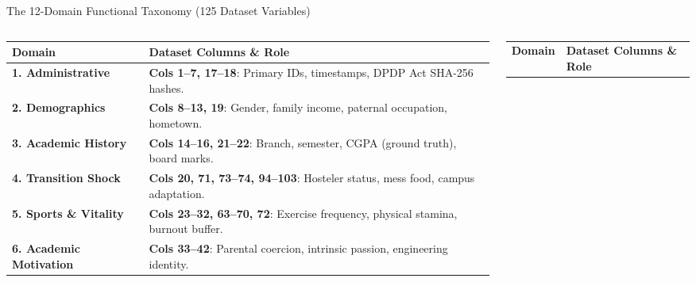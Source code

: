 \documentclass{beamer}
\begin{document}
\begin{frame}[t]{The 12-Domain Functional Taxonomy (125 Dataset Variables)}
  \begin{columns}[T]
    \begin{column}{0.49\textwidth}
      \begin{tcolorbox}[colback=white, colframe=BlueDeep, arc=1.2mm, boxrule=0.8pt, top=0.5mm, bottom=0.5mm, left=1mm, right=1mm, title={\scriptsize\bfseries\color{white}Contextual \& Somatic Domains (1--6)}, colbacktitle=BlueDeep]
        \fontsize{4.8pt}{5.8pt}\selectfont
        \renewcommand{\arraystretch}{0.85}
        \begin{tabularx}{\linewidth}{@{}l X@{}}
          \toprule
          \textbf{Domain} & \textbf{Dataset Columns \& Role} \\
          \midrule
          \rowcolor{BlueLight} \textbf{1. Administrative} & \textbf{Cols 1--7, 17--18}: Primary IDs, timestamps, DPDP Act SHA-256 hashes. \\
          \rowcolor{CanvasBG} \textbf{2. Demographics} & \textbf{Cols 8--13, 19}: Gender, family income, paternal occupation, hometown. \\
          \rowcolor{BlueLight} \textbf{3. Academic History} & \textbf{Cols 14--16, 21--22}: Branch, semester, CGPA (ground truth), board marks. \\
          \rowcolor{CanvasBG} \textbf{4. Transition Shock} & \textbf{Cols 20, 71, 73--74, 94--103}: Hosteler status, mess food, campus adaptation. \\
          \rowcolor{BlueLight} \textbf{5. Sports \& Vitality} & \textbf{Cols 23--32, 63--70, 72}: Exercise frequency, physical stamina, burnout buffer. \\
          \rowcolor{CanvasBG} \textbf{6. Academic Motivation} & \textbf{Cols 33--42}: Parental coercion, intrinsic passion, engineering identity. \\
          \bottomrule
        \end{tabularx}
      \end{tcolorbox}
    \end{column}
    \begin{column}{0.49\textwidth}
      \begin{tcolorbox}[colback=white, colframe=BluePrimary, arc=1.2mm, boxrule=0.8pt, top=0.5mm, bottom=0.5mm, left=1mm, right=1mm, title={\scriptsize\bfseries\color{white}Regulatory \& Clinical Domains (7--13)}, colbacktitle=BluePrimary]
        \fontsize{4.8pt}{5.8pt}\selectfont
        \renewcommand{\arraystretch}{0.85}
        \begin{tabularx}{\linewidth}{@{}l X@{}}
          \toprule
          \textbf{Domain} & \textbf{Dataset Columns \& Role} \\

\end{tabularx}
\end{tcolorbox}
\end{column}
\end{columns}
\end{frame}
\end{document}

